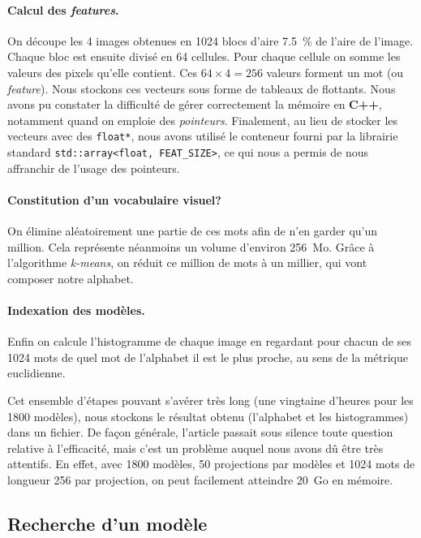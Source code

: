 \documentclass[12pt, a4paper, oneside]{article}
\begin{document}
\paragraph{Calcul des \emph{features}.}
On découpe les 4 images obtenues en \num{1024} blocs d'aire \SI{7.5}{\percent} de l'aire de l'image.
Chaque bloc est ensuite divisé en 64 cellules.
Pour chaque cellule on somme les valeurs des pixels qu'elle contient.
Ces $64 \times 4 = 256$ valeurs forment un mot (ou \emph{feature}).
Nous stockons ces vecteurs sous forme de tableaux de flottants.
Nous avons pu constater la difficulté de gérer correctement la mémoire en \textbf{C++}, notamment quand on emploie des \emph{pointeurs}.
Finalement, au lieu de stocker les vecteurs avec des \verb|float*|, nous avons utilisé le conteneur fourni par la librairie standard \verb|std::array<float, FEAT_SIZE>|, ce qui nous a permis de nous affranchir de l'usage des pointeurs.

\paragraph{Constitution d'un vocabulaire visuel?}
On élimine aléatoirement une partie de ces mots afin de n'en garder qu'un million.
Cela représente néanmoins un volume d'environ \num{256}~Mo.
Grâce à l'algorithme \emph{k-means}, on réduit ce million de mots à un millier, qui vont composer notre alphabet.

\paragraph{Indexation des modèles.}
Enfin on calcule l'histogramme de chaque image en regardant pour chacun de ses \num{1024} mots de quel mot de l'alphabet il est le plus proche, au sens de la métrique euclidienne.


Cet ensemble d'étapes pouvant s'avérer très long (une vingtaine d'heures pour les \num{1800} modèles), nous stockons le résultat obtenu (l'alphabet et les histogrammes) dans un fichier.
De façon générale, l'article passait sous silence toute question relative à l'efficacité, mais c'est un problème auquel nous avons dû être très attentifs.
En effet, avec \num{1800} modèles, 50 projections par modèles et \num{1024} mots de longueur 256 par projection, on peut facilement atteindre 20~Go en mémoire.


\subsection{Recherche d'un modèle}
\end{document}
